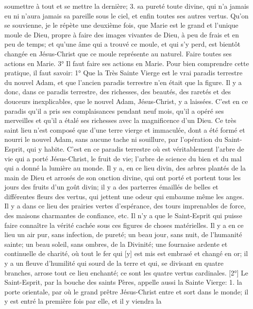 soumettre à tout et se mettre la dernière; 3. sa pureté toute divine, qui n'a jamais eu ni n'aura jamais sa pareille
sous le ciel, et enfin toutes ses autres vertus.
Qu'on se souvienne, je le répète une deuxième fois, que Marie est le grand et l'unique moule de Dieu, propre à
faire des images vivantes de Dieu, à peu de frais et en peu de temps; et qu'une âme qui a trouvé ce moule, et qui
s'y perd, est bientôt changée en Jésus-Christ que ce moule représente au naturel.
Faire toutes ses actions en Marie.
 3° Il faut faire ses actions en Marie. Pour bien comprendre cette pratique, il faut savoir: 1° Que la Très Sainte
Vierge est le vrai paradis terrestre du nouvel Adam, et que l'ancien paradis terrestre n'en était que la figure. Il y a
donc, dans ce paradis terrestre, des richesses, des beautés, des raretés et des douceurs inexplicables, que le
nouvel Adam, Jésus-Christ, y a laissées. C'est en ce paradis qu'il a pris ses complaisances pendant neuf mois,
qu'il a opéré ses merveilles et qu'il a étalé ses richesses avec la magnificence d'un Dieu. Ce très saint lieu n'est
composé que d'une terre vierge et immaculée, dont a été formé et nourri le nouvel Adam, sans aucune tache ni
souillure, par l'opération du Saint-Esprit, qui y habite. C'est en ce paradis terrestre où est véritablement l'arbre de
vie qui a porté Jésus-Christ, le fruit de vie; l'arbre de science du bien et du mal qui a donné la lumière au monde. Il
y a, en ce lieu divin, des arbres plantés de la main de Dieu et arrosés de son onction divine, qui ont porté et
portent tous les jours des fruits d'un goût divin; il y a des parterres émaillés de belles et différentes fleurs des
vertus, qui jettent une odeur qui embaume même les anges. Il y a dans ce lieu des prairies vertes d'espérance,
des tours imprenables de force, des maisons charmantes de confiance, etc. Il n'y a que le Saint-Esprit qui puisse
faire connaître la vérité cachée sous ces figures de choses matérielles. Il y a en ce lieu un air pur, sans infection,
de pureté; un beau jour, sans nuit, de l'humanité sainte; un beau soleil, sans ombres, de la Divinité; une fournaise
ardente et continuelle de charité, où tout le fer qui [y] est mis est embrasé et changé en or; il y a un fleuve
d'humilité qui sourd de la terre et qui, se divisant en quatre branches, arrose tout ce lieu enchanté; ce sont les
quatre vertus cardinales.
 [2°] Le Saint-Esprit, par la bouche des saints Pères, appelle aussi la Sainte Vierge: 1. la porte orientale, par
où le grand prêtre Jésus-Christ entre et sort dans le monde; il y est entré la première fois par elle, et il y viendra la
